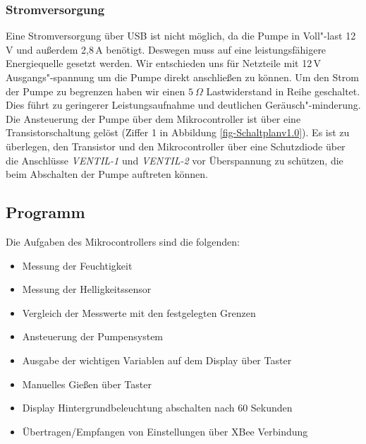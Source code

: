 	
\subsubsection{Stromversorgung}

Eine Stromversorgung über USB ist nicht möglich, da die Pumpe in Voll"-last 12\,V und außerdem 2,8\,A benötigt. 
Deswegen muss auf eine leistungsfähigere Energiequelle gesetzt werden.
Wir entschieden uns für Netzteile mit 12\,V Ausgangs"-spannung um die Pumpe direkt anschließen zu können. 
Um den Strom der Pumpe zu begrenzen haben wir einen \begin{math}5~\Omega\end{math} Lastwiderstand in Reihe geschaltet.
Dies führt zu geringerer Leistungsaufnahme und deutlichen Geräusch"-minderung.
Die Ansteuerung der Pumpe über dem Mikrocontroller ist über eine Transistorschaltung gelöst (Ziffer 1 in Abbildung \ref{fig-Schaltplanv1.0}).
Es ist zu überlegen, den Transistor und den Mikrocontroller über eine Schutzdiode über die Anschlüsse \emph{VENTIL-1} und \emph{VENTIL-2} vor Überspannung zu schützen, die beim Abschalten der Pumpe auftreten können. 
 

\subsection{Programm}
	

	Die Aufgaben des Mikrocontrollers sind die folgenden:
		\begin{itemize}
			\item Messung der Feuchtigkeit
			\item Messung der Helligkeitssensor
			\item Vergleich der Messwerte mit den festgelegten Grenzen
			\item Ansteuerung der Pumpensystem
			\item Ausgabe der wichtigen Variablen auf dem Display über Taster
			\item Manuelles Gießen über Taster
			\item Display Hintergrundbeleuchtung abschalten nach 60  Sekunden
			\item Übertragen/Empfangen von Einstellungen über XBee Verbindung
		\end{itemize}
		
